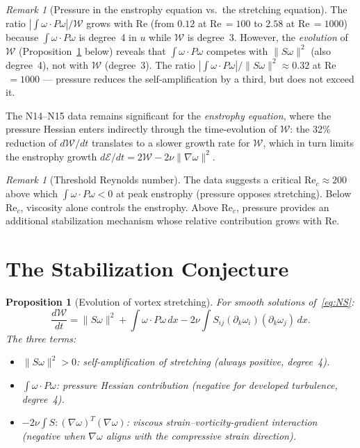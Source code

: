 \documentclass[11pt,a4paper]{article}
\theoremstyle{plain}
\newtheorem{proposition}[theorem]{Proposition}
\theoremstyle{definition}
\theoremstyle{remark}
\newtheorem{remark}[theorem]{Remark}
\begin{document}
\begin{remark}[Pressure in the enstrophy equation
vs.\ the stretching equation]
\label{rem:degree4}
The ratio $|\int\omega\cdot P\omega|/\mathcal{W}$
grows with Re (from $0.12$ at Re$\,=100$ to $2.58$
at Re$\,=1000$) because $\int\omega\cdot P\omega$
is degree~4 in $u$ while $\mathcal{W}$ is degree~3.
However, the \emph{evolution} of $\mathcal{W}$
(Proposition~\ref{prop:W-evol} below) reveals that
$\int\omega\cdot P\omega$ competes with $\|S\omega\|^2$
(also degree~4), not with $\mathcal{W}$ (degree~3).
The ratio $|\int\omega\cdot P\omega|/\|S\omega\|^2
\approx 0.32$ at Re$\,=1000$ --- pressure reduces the
self-amplification by a third, but does not exceed it.

The N14--N15 data remains significant for the
\emph{enstrophy equation}, where the pressure Hessian
enters indirectly through the time-evolution of
$\mathcal{W}$: the 32\% reduction of
$d\mathcal{W}/dt$ translates to a slower growth rate
for $\mathcal{W}$, which in turn limits the enstrophy
growth $d\mathcal{E}/dt = 2\mathcal{W}
- 2\nu\|\nabla\omega\|^2$.
\end{remark}

\begin{remark}[Threshold Reynolds number]
\label{rem:threshold}
The data suggests a critical
$\mathrm{Re}_c\approx 200$ above which
$\int\omega\cdot P\omega < 0$ at peak enstrophy
(pressure opposes stretching).  Below $\mathrm{Re}_c$,
viscosity alone controls the enstrophy.
Above $\mathrm{Re}_c$, pressure provides an
additional stabilization mechanism whose relative
contribution grows with Re.
\end{remark}


\section{The Stabilization Conjecture}\label{sec:conjecture}

\begin{proposition}[Evolution of vortex stretching]
\label{prop:W-evol}
For smooth solutions of~\eqref{eq:NS}:
\begin{equation}\label{eq:W-evol}
\frac{d\mathcal{W}}{dt} = \|S\omega\|^2
+ \int\omega\cdot P\omega\,dx
- 2\nu\int S_{ij}(\partial_k\omega_i)
(\partial_k\omega_j)\,dx.
\end{equation}
The three terms:
\begin{itemize}[leftmargin=2em]
\item $\|S\omega\|^2 > 0$: self-amplification of
  stretching (always positive, degree~4).
\item $\int\omega\cdot P\omega$: pressure Hessian
  contribution (negative for developed turbulence,
  degree~4).
\item $-2\nu\int S:(\nabla\omega)^T(\nabla\omega)$:
  viscous strain--vorticity-gradient interaction
  (negative when $\nabla\omega$ aligns with the
  compressive strain direction).
\end{itemize}
\end{proposition}
\end{document}
